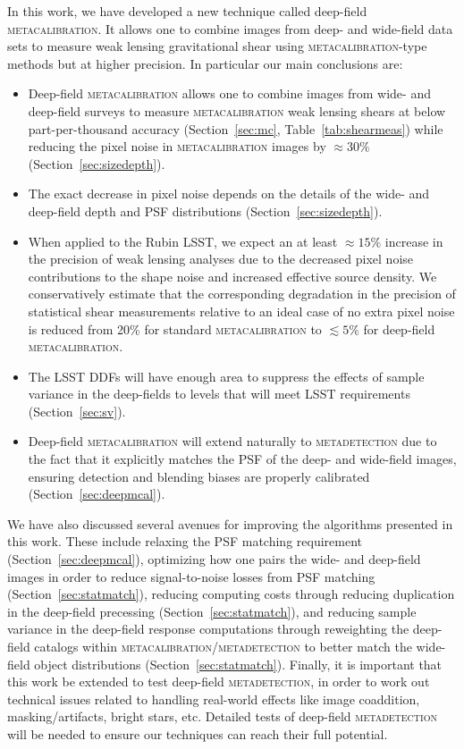 \documentclass[twocolumn]{openjournal}
\makeatletter
\newcommand{\mdet}{\textsc{metadetection}\@\xspace}
\newcommand{\mcal}{\textsc{metacalibration}\@\xspace}
\makeatother
\begin{document}
In this work, we have developed a new technique called deep-field \mcal. It allows one
to combine images from deep- and wide-field data sets to measure weak lensing
gravitational shear using \mcal-type methods but at higher precision. In particular our main
conclusions are:
\begin{itemize}
  \item Deep-field \mcal allows one to combine images from wide- and deep-field surveys
    to measure \mcal weak lensing shears at below part-per-thousand accuracy
    (Section~\ref{sec:mc}, Table~\ref{tab:shearmeas}) while reducing the pixel noise
    in \mcal images by $\approx30\%$ (Section~\ref{sec:sizedepth}).
  \item The exact decrease in pixel noise depends on the details of
    the wide- and deep-field depth and PSF distributions (Section~\ref{sec:sizedepth}).
  \item When applied to the Rubin LSST, we expect an at least $\approx15\%$ increase in
    the precision of weak lensing analyses due to the decreased pixel noise contributions
    to the shape noise and increased effective source density. We conservatively
    estimate that the corresponding degradation in the precision of statistical
    shear measurements relative to an ideal case of no extra pixel noise
    is reduced from 20\% for standard \mcal to $\lesssim5\%$ for deep-field \mcal.
  \item The LSST DDFs will have enough area to suppress the effects of sample variance
    in the deep-fields to levels that will meet LSST requirements
    (Section~\ref{sec:sv}).
  \item Deep-field \mcal will extend naturally to \mdet due to the fact that it
    explicitly matches the PSF of the deep- and wide-field images, ensuring detection
    and blending biases are properly calibrated (Section~\ref{sec:deepmcal}).
\end{itemize}

We have also discussed several avenues for improving the algorithms presented in this
work. These include relaxing the PSF matching requirement (Section~\ref{sec:deepmcal}),
optimizing how one pairs the wide- and deep-field images in order to reduce
signal-to-noise losses from PSF matching (Section~\ref{sec:statmatch}), reducing
computing costs through reducing duplication in the deep-field precessing
(Section~\ref{sec:statmatch}), and reducing sample variance in the deep-field response
computations through reweighting the deep-field catalogs within \mcal/\mdet to better
match the wide-field object distributions (Section~\ref{sec:statmatch}).
Finally, it is important that this work be extended to test deep-field \mdet,
in order to work out technical issues related to
handling real-world effects like image coaddition, masking/artifacts, bright stars, etc.
Detailed tests of deep-field \mdet will be needed to ensure our techniques can reach
their full potential.
\end{document}
